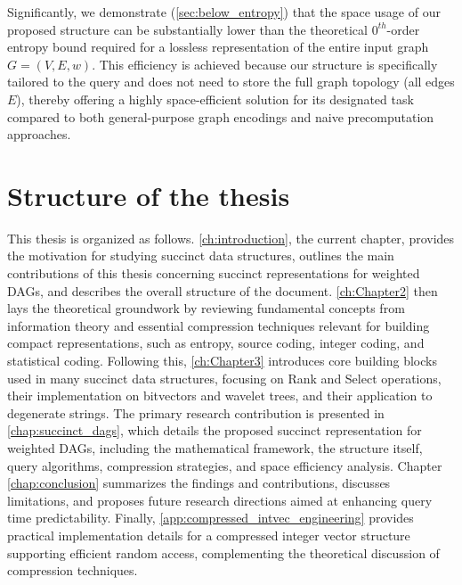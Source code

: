 Significantly, we demonstrate (\autoref{sec:below_entropy}) that the space usage of our proposed structure can be substantially lower than the theoretical $0^{th}$-order entropy bound required for a lossless representation of the entire input graph $G=(V, E, w)$. This efficiency is achieved because our structure is specifically tailored to the \Rank{} query and does not need to store the full graph topology (all edges $E$), thereby offering a highly space-efficient solution for its designated task compared to both general-purpose graph encodings and naive precomputation approaches.

\section{Structure of the thesis}
\label{sec:structure}

This thesis is organized as follows. \autoref{ch:introduction}, the current chapter, provides the motivation for studying succinct data structures, outlines the main contributions of this thesis concerning succinct representations for weighted DAGs, and describes the overall structure of the document. \autoref{ch:Chapter2} then lays the theoretical groundwork by reviewing fundamental concepts from information theory and essential compression techniques relevant for building compact representations, such as entropy, source coding, integer coding, and statistical coding. Following this, \autoref{ch:Chapter3} introduces core building blocks used in many succinct data structures, focusing on Rank and Select operations, their implementation on bitvectors and wavelet trees, and their application to degenerate strings. The primary research contribution is presented in \autoref{chap:succinct_dags}, which details the proposed succinct representation for weighted DAGs, including the mathematical framework, the structure itself, query algorithms, compression strategies, and space efficiency analysis. Chapter \ref{chap:conclusion} summarizes the findings and contributions, discusses limitations, and proposes future research directions aimed at enhancing query time predictability. Finally, \autoref{app:compressed_intvec_engineering} provides practical implementation details for a compressed integer vector structure supporting efficient random access, complementing the theoretical discussion of compression techniques.
